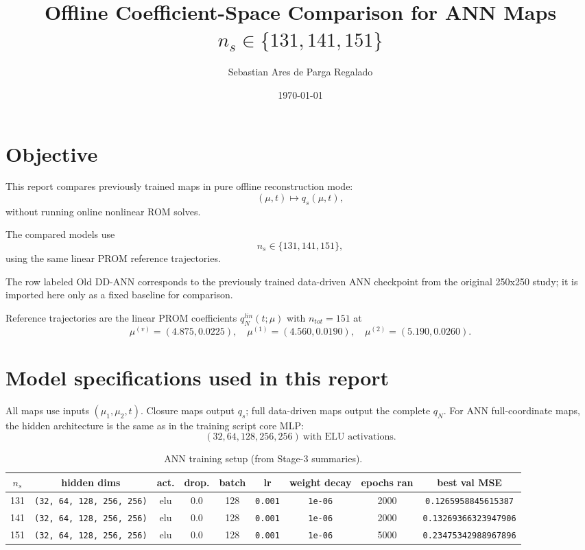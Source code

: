 \documentclass[11pt]{article}
\title{Offline Coefficient-Space Comparison for ANN Maps\\$n_s\in\{131,141,151\}$}
\author{Sebastian Ares de Parga Regalado}
\date{\today}
\begin{document}
\maketitle

\section*{Objective}
This report compares previously trained maps in pure offline reconstruction mode:
\[
(\mu,t)\mapsto q_s(\mu,t),
\]
without running online nonlinear ROM solves.

The compared models use
\[
n_s\in\{131,141,151\},
\]
using the same linear PROM reference trajectories.

The row labeled Old DD-ANN corresponds to the previously trained data-driven ANN checkpoint from the original 250x250 study; it is imported here only as a fixed baseline for comparison.

Reference trajectories are the linear PROM coefficients $q_N^{lin}(t;\mu)$ with $n_{tot}=151$ at
\[
\mu^{(v)}=(4.875,0.0225),\quad
\mu^{(1)}=(4.560,0.0190),\quad
\mu^{(2)}=(5.190,0.0260).
\]


\section*{Model specifications used in this report}
All maps use inputs $(\mu_1,\mu_2,t)$. Closure maps output $q_s$; full data-driven maps output the complete $q_N$.
For ANN full-coordinate maps, the hidden architecture is the same as in the training script core MLP:
\[
(32,64,128,256,256)\ \text{with ELU activations}.
\]

\begin{table}[H]
\centering
\caption{ANN training setup (from Stage-3 summaries).}
\scriptsize
\begin{tabular}{ccccccccc}
\toprule
$n_s$ & hidden dims & act. & drop. & batch & lr & weight decay & epochs ran & best val MSE \\
\midrule
131 & \texttt{(32, 64, 128, 256, 256)} & elu & 0.0 & 128 & \texttt{0.001} & \texttt{1e-06} & 2000 & \texttt{0.1265958845615387} \\
141 & \texttt{(32, 64, 128, 256, 256)} & elu & 0.0 & 128 & \texttt{0.001} & \texttt{1e-06} & 2000 & \texttt{0.13269366323947906} \\
151 & \texttt{(32, 64, 128, 256, 256)} & elu & 0.0 & 128 & \texttt{0.001} & \texttt{1e-06} & 5000 & \texttt{0.23475342988967896} \\
\bottomrule
\end{tabular}
\end{table}
\end{document}
